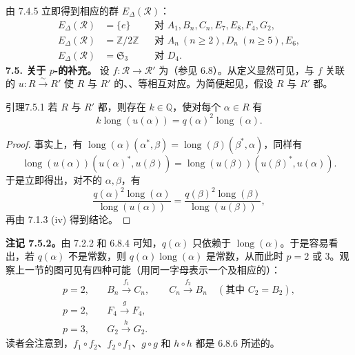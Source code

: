 由 7.4.5 立即得到相应的群 $E_\Delta(\mathscr R)$：
\[\begin{aligned}
E_\Delta(\mathscr R)&=\{e\}&&\text{对 }A_1,B_n,C_n,E_7,E_8,F_4,G_2,\\
E_\Delta(\mathscr R)&=\mathbb Z/2\mathbb Z&&\text{对 }A_n\ (n\geq2),D_n\ (n\geq5),E_6,\\
E_\Delta(\mathscr R)&=\mathfrak S_3&&\text{对 }D_4.
\end{aligned}\]
\textbf{7.5. 关于 $p$-的补充。}
设 $f:\mathscr R\to\mathscr R'$ 为（参见 6.8）。从定义显然可见，与 $f$ 关联的 $u:R\xrightarrow\sim R'$ 使 $R$ 与 $R'$ 的、、等相互对应。为简便起见，假设 $R$ 与 $R'$ 都。
\begin{SGAresult}{引理}{7.5.1}
若 $R$ 与 $R'$ 都，则存在 $k\in\mathbb Q$，使对每个 $\alpha\in R$ 有
\[k\operatorname{long}(u(\alpha))=q(\alpha)^2\operatorname{long}(\alpha).\]
\end{SGAresult}
\begin{proof}
事实上，有 $\operatorname{long}(\alpha)(\alpha^*,\beta)=\operatorname{long}(\beta)(\beta^*,\alpha)$，同样有
\[\operatorname{long}(u(\alpha))(u(\alpha)^*,u(\beta))
=\operatorname{long}(u(\beta))(u(\beta)^*,u(\alpha)).\]
于是立即得出，对不的 $\alpha,\beta$，有
\[\frac{q(\alpha)^2\operatorname{long}(\alpha)}{\operatorname{long}(u(\alpha))}
=\frac{q(\beta)^2\operatorname{long}(\beta)}{\operatorname{long}(u(\beta))},\]
再由 7.1.3 (iv) 得到结论。
\end{proof}
\textbf{注记 7.5.2。}由 7.2.2 和 6.8.4 可知，$q(\alpha)$ 只依赖于 $\operatorname{long}(\alpha)$。于是容易看出，若 $q(\alpha)$ 不是常数，则 $q(\alpha)\operatorname{long}(\alpha)$ 是常数，从而此时 $p=2$ 或 $3$。观察上一节的图可见有四种可能（用同一字母表示一个及相应的）：
\[\begin{aligned}
p=2,&\quad B_n\xrightarrow{f_1}C_n,\qquad C_n\xrightarrow{f_2}B_n\quad(\text{其中 }C_2=B_2),\\
p=2,&\quad F_4\xrightarrow g F_4,\\
p=3,&\quad G_2\xrightarrow h G_2.
\end{aligned}\]
读者会注意到，$f_1\circ f_2$、$f_2\circ f_1$、$g\circ g$ 和 $h\circ h$ 都是 6.8.6 所述的。

